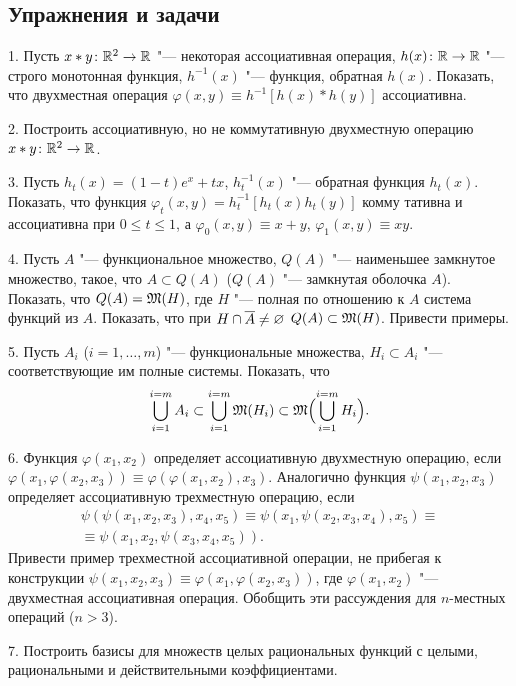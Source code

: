 \subsection*{Упражнения и задачи}
1. Пусть $x*y\colon\mathbb R^2\to\mathbb R$ "--- некоторая ассоциативная операция,
$h(x)\colon\mathbb R\to\mathbb R$ "--- строго монотонная функция, $h^{-1}(x)$ "---
функция, обратная $h(x)$. Показать, что двухместная операция
$\varphi(x,y)\equiv h^{-1}[h(x)*h(y)]$ ассоциативна.

2. Построить ассоциативную, но не коммутативную двухместную операцию
$x*y\colon\mathbb R^2\to\mathbb R$.

3. Пусть $h_t(x)=(1-t)e^x+tx$, $h_t^{-1}(x)$ "--- обратная функция
$h_t(x)$. Показать, что функция $\varphi_t(x,y)=h_t^{-1}[h_t(x)h_t(y)]$
комму\-%
%
тативна и ассоциативна при $0\le t\le1$, а $\varphi_0(x,y)\equiv x+y$,
$\varphi_1(x,y)\equiv xy$.

4. Пусть $A$ "--- функциональное множество, $Q(A)$ "--- наименьшее
замкнутое множество, такое, что $A\subset Q(A)$ ($Q(A)$ "--- замкнутая
оболочка $A$). Показать, что $Q(A)=\mathfrak M(H)$, где $H$ "--- полная по
отношению к $A$ система функций из $A$. Показать, что при
$H\cap\overline{A}\ne\varnothing$ $Q(A)\subset\mathfrak M(H)$. Привести примеры.

5. Пусть $A_i$ ($i=1,\dots,m$) "--- функциональные множества,
$H_i\subset A_i$ "--- соответствующие им полные системы. Показать, что
\[
\bigcup_{i=1}^{i=m}A_i\subset\bigcup_{i=1}^{i=m}\mathfrak M(H_i)\subset\mathfrak M\Bigl(\bigcup_{i=1}^{i=m}H_i\Bigr).
\]

6. Функция $\varphi(x_1,x_2)$ определяет ассоциативную двухместную
операцию, если $\varphi(x_1,\varphi(x_2,x_3))\equiv\varphi(\varphi(x_1,x_2),x_3)$.
Аналогично функция $\psi(x_1,x_2,x_3)$ определяет ассоциативную
трехместную операцию, если
\begin{multline*}
\psi(\psi(x_1,x_2,x_3),x_4,x_5)\equiv\psi(x_1,\psi(x_2,x_3,x_4),x_5)\equiv{}\\
\equiv\psi(x_1,x_2,\psi(x_3,x_4,x_5)).
\end{multline*}
Привести пример трехместной ассоциативной операции, не прибегая
к конструкции $\psi(x_1,x_2,x_3)\equiv\varphi(x_1,\varphi(x_2,x_3))$, где
$\varphi(x_1,x_2)$ "--- двухместная ассоциативная операция. Обобщить эти
рассуждения для $n$-местных операций ($n>3$).

7. Построить базисы для множеств целых рациональных функций с целыми,
рациональными и действительными коэффициентами.
